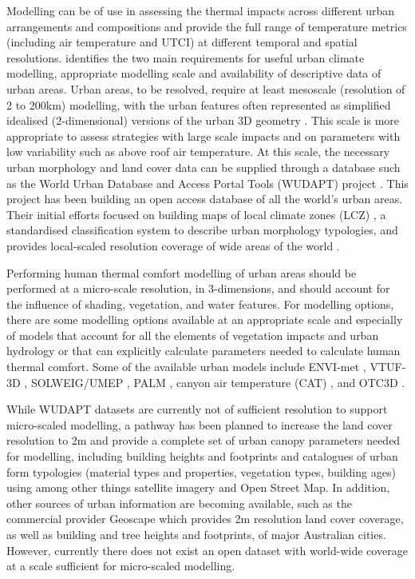 \documentclass[final,3p,times,authoryear]{elsarticle}
\begin{document}
Modelling can be of use in assessing the thermal impacts across different urban arrangements and compositions and provide the full range of temperature metrics (including air temperature and UTCI) at different temporal and spatial resolutions. \cite{Masson2020} identifies the two main requirements for useful urban climate modelling, appropriate modelling scale and availability of descriptive data of urban areas. Urban areas, to be resolved, require at least mesoscale (resolution of 2 to 200km) modelling, with the urban features often represented as simplified idealised (2-dimensional) versions of the urban 3D geometry \citep{Masson2005}. This scale is more appropriate to assess strategies with large scale impacts and on parameters with low variability such as above roof air temperature. At this scale, the necessary urban morphology and land cover data can be supplied through a database such as the World Urban Database and Access Portal Tools (WUDAPT) project \citep{Ching2018a}. This project has been building an open access database of all the world's urban areas. Their initial efforts focused on building maps of local climate zones (LCZ) \citep{Stewart2012b}, a standardised classification system to describe urban morphology typologies, and provides local-scaled resolution coverage of wide areas of the world \citep{Demuzere2019}.


Performing human thermal comfort modelling of urban areas should be performed at a micro-scale resolution, in 3-dimensions, and should account for the influence of shading, vegetation, and water features. For modelling options, there are some modelling options available at an appropriate scale and especially of models that account for all the elements of vegetation impacts and urban hydrology or that can explicitly calculate parameters needed to calculate human thermal comfort. Some of the available urban models include ENVI-met \citep{Bruse1999}, VTUF-3D \citep{Nice2018a}, SOLWEIG/UMEP \citep{Lindberg2018}, PALM \citep{Dominik2019}, canyon air temperature (CAT) \citep{Erell2006}, and OTC3D \citep{Nazarian2018}. 

While WUDAPT datasets are currently not of sufficient resolution to support micro-scaled modelling, a pathway has been planned \citep{Ching2019} to increase the land cover resolution to 2m and provide a complete set of urban canopy parameters needed for modelling, including building heights and footprints and catalogues of urban form typologies (material types and properties, vegetation types, building ages) using among other things satellite imagery and Open Street Map. In addition, other sources of urban information are becoming available, such as the commercial provider Geoscape \citep{Geoscape2020} which provides 2m resolution land cover coverage, as well as building and tree heights and footprints, of major Australian cities. However, currently there does not exist an open dataset with world-wide coverage at a scale sufficient for micro-scaled modelling. 
\end{document}
